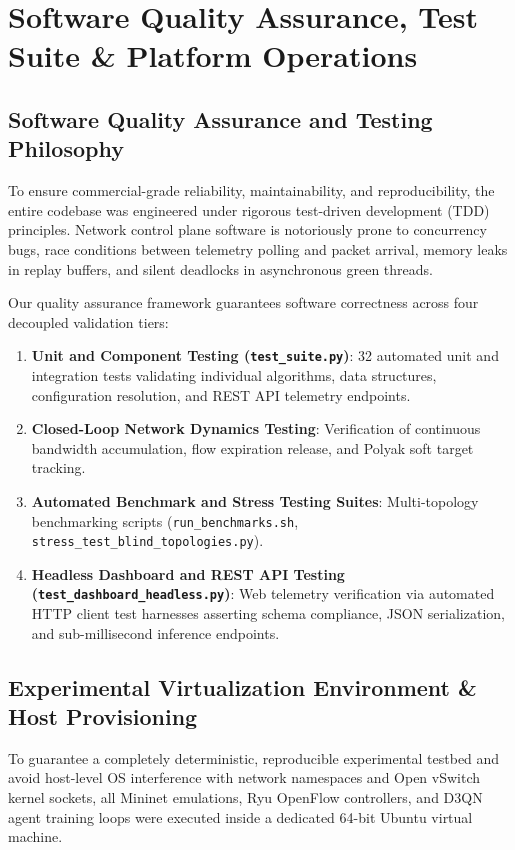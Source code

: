 \chapter{Software Quality Assurance, Test Suite \& Platform Operations}
\label{chap:verification}

\section{Software Quality Assurance and Testing Philosophy}
To ensure commercial-grade reliability, maintainability, and reproducibility, the entire codebase was engineered under rigorous test-driven development (TDD) principles. Network control plane software is notoriously prone to concurrency bugs, race conditions between telemetry polling and packet arrival, memory leaks in replay buffers, and silent deadlocks in asynchronous green threads.

Our quality assurance framework guarantees software correctness across four decoupled validation tiers:
\begin{enumerate}
    \item \textbf{Unit and Component Testing (\texttt{test\_suite.py})}: 32 automated unit and integration tests validating individual algorithms, data structures, configuration resolution, and REST API telemetry endpoints.
    \item \textbf{Closed-Loop Network Dynamics Testing}: Verification of continuous bandwidth accumulation, flow expiration release, and Polyak soft target tracking.
    \item \textbf{Automated Benchmark and Stress Testing Suites}: Multi-topology benchmarking scripts (\texttt{run\_benchmarks.sh}, \texttt{stress\_test\_blind\_topologies.py}).
    \item \textbf{Headless Dashboard and REST API Testing (\texttt{test\_dashboard\_headless.py})}: Web telemetry verification via automated HTTP client test harnesses asserting schema compliance, JSON serialization, and sub-millisecond inference endpoints.
\end{enumerate}

\section{Experimental Virtualization Environment \& Host Provisioning}
\label{sec:vm_environment}
To guarantee a completely deterministic, reproducible experimental testbed and avoid host-level OS interference with network namespaces and Open vSwitch kernel sockets, all Mininet emulations, Ryu OpenFlow controllers, and D3QN agent training loops were executed inside a dedicated 64-bit Ubuntu virtual machine.

